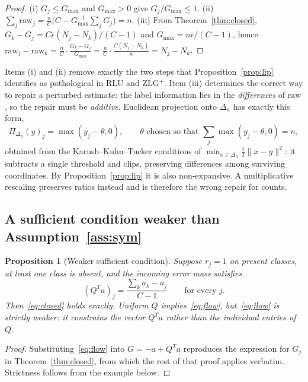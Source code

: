 \documentclass[11pt]{article}
\newtheorem{proposition}{Proposition}
\theoremstyle{remark}
\newcommand{\simplex}{\Delta_n}
\begin{document}
\begin{proof}
(i) $G_j \le G_{\max}$ and $G_{\max}>0$ give $G_j/G_{\max} \le 1$.
(ii) $\sum_j \mathrm{raw}_j = \tfrac{n}{C}\bigl(C - G_{\max}^{-1}\sum_j G_j\bigr) = n$.
(iii) From Theorem~\ref{thm:closed},
$G_k - G_j = C\bar\epsilon(N_j-N_k)/(C-1)$ and
$G_{\max} = n\bar\epsilon/(C-1)$, hence
$\mathrm{raw}_j - \mathrm{raw}_k = \tfrac{n}{C}\cdot\tfrac{G_k-G_j}{G_{\max}}
 = \tfrac{n}{C}\cdot\tfrac{C(N_j-N_k)}{n} = N_j - N_k$.
\end{proof}

Items (i) and (ii) remove exactly the two steps that
Proposition~\ref{prop:lip} identifies as pathological in RLU and ZLG$^+$.
Item (iii) determines the correct way to repair a perturbed estimate: the
label information lies in the \emph{differences} of $\mathrm{raw}$, so the
repair must be \emph{additive}. Euclidean projection onto $\simplex$ has
exactly this form,
\[
 \Pi_{\simplex}(y)_j = \max(y_j - \theta, 0),
 \qquad \theta \text{ chosen so that } \textstyle\sum_j \max(y_j-\theta,0) = n,
\]
obtained from the Karush--Kuhn--Tucker conditions of
$\min_{x\in\simplex}\tfrac12\|x-y\|^2$: it subtracts a single threshold and
clips, preserving differences among surviving coordinates. By
Proposition~\ref{prop:lip} it is also non-expansive. A multiplicative
rescaling preserves ratios instead and is therefore the wrong repair for
counts.

\subsection{A sufficient condition weaker than Assumption~\ref{ass:sym}}

\begin{proposition}[Weaker sufficient condition]
\label{prop:weak}
Suppose $r_j = 1$ on present classes, at least one class is absent, and the
incoming error mass satisfies
\begin{equation}
 (Q^Ta)_j = \frac{\sum_k a_k - a_j}{C-1} \qquad \text{for every } j .
 \label{eq:flow}
\end{equation}
Then~\eqref{eq:closed} holds exactly. Uniform $Q$ implies~\eqref{eq:flow},
but~\eqref{eq:flow} is strictly weaker: it constrains the vector $Q^Ta$
rather than the individual entries of $Q$.
\end{proposition}

\begin{proof}
Substituting~\eqref{eq:flow} into $G = -a + Q^Ta$ reproduces the expression
for $G_j$ in Theorem~\ref{thm:closed}, from which the rest of that proof
applies verbatim. Strictness follows from the example below.
\end{proof}
\end{document}
